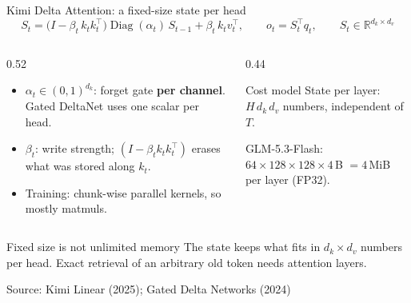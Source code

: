 \documentclass[handout]{beamer}
\begin{document}
\begin{frame}{Kimi Delta Attention: a fixed-size state per head}
  \small
  \[
    S_t=\big(I-\beta_t\,k_tk_t^{\top}\big)\operatorname{Diag}(\alpha_t)\,S_{t-1}+\beta_t\,k_t v_t^{\top},
    \qquad
    o_t=S_t^{\top}q_t,
    \qquad S_t\in\mathbb{R}^{d_k\times d_v}
  \]
  \begin{columns}[t]
    \begin{column}{0.52\linewidth}
      \footnotesize
      \begin{itemize}
          \setlength{\itemsep}{2pt}
        \item $\alpha_t\in(0,1)^{d_k}$: forget gate \textbf{per channel}. Gated DeltaNet uses one scalar per head.
        \item $\beta_t$: write strength; $(I-\beta_tk_tk_t^{\top})$ erases what was stored along $k_t$.
        \item Training: chunk-wise parallel kernels, so mostly matmuls.
      \end{itemize}
    \end{column}
    \begin{column}{0.44\linewidth}
      \begin{block}{Cost model}
        \footnotesize
        State per layer: $H\,d_k\,d_v$ numbers, independent of $T$.\par
        GLM-5.3-Flash: $64\times128\times128\times4$\,B $=4$\,MiB per layer (FP32).
      \end{block}
    \end{column}
  \end{columns}
  \vspace{-2pt}
  \begin{alertblock}{Fixed size is not unlimited memory}
    \footnotesize The state keeps what fits in $d_k\times d_v$ numbers per head. Exact retrieval of an arbitrary old token needs attention layers.
  \end{alertblock}
  \vspace{-6pt}\hfill{\tiny\color{neutraldark}Source: Kimi Linear (2025); Gated Delta Networks (2024)}
\end{frame}
\end{document}
